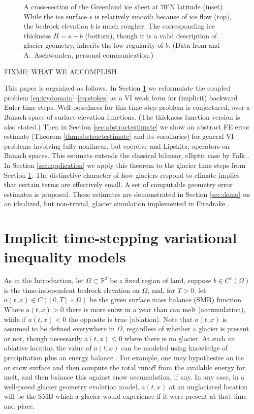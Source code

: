 \documentclass[hidelinks,onefignum,onetabnum,final]{siamart220329}  %
\newcommand{\RR}{\mathbb{R}}
\begin{document}
\begin{figure}
\begin{minipage}[t]{0.13\textwidth}
\end{minipage}
\caption{A cross-section of the Greenland ice sheet at $70^\circ$N latitude (inset).  While the ice surface $s$ is relatively smooth because of ice flow (top), the bedrock elevation $b$ is much rougher.  The corresponding ice thickness $H = s-b$ (bottom), though it is a valid description of glacier geometry, inherits the low regularity of $b$.  (Data from \cite{Morlighemetal2017} and A.~Aschwanden, personal communication.)}
\label{fig:giscross}
\end{figure}

FIXME: WHAT WE ACCOMPLISH

This paper is organized as follows.  In Section \ref{sec:models} we reformulate the coupled problem \eqref{eq:icydomain}--\eqref{eq:stokes} as a VI weak form for (implicit) backward Euler time steps.  Well-posedness for this time-step problem is conjectured, over a Banach space of surface elevation functions.  (The thickness function version is also stated.)  Then in Section \ref{sec:abstractestimate} we show an abstract FE error estimate (Theorem \ref{thm:abstractestimate} and its corollaries) for general VI problems involving fully-nonlinear, but coercive and Lipshitz, operators on Banach spaces.  This estimate extends the classical bilinear, elliptic case by Falk \cite{Falk1974}.  In Section \ref{sec:application} we apply this theorem to the glacier time steps from Section \ref{sec:models}.  The distinctive character of how glaciers respond to climate implies that certain terms are effectively small.  A set of computable geometry error estimates is proposed.  These estimates are demonstrated in Section \ref{sec:demo} on an idealized, but non-trivial, glacier simulation implemented in Firedrake \cite{Hametal2023}.


\section{Implicit time-stepping variational inequality models} \label{sec:models}

As in the Introduction, let $\Omega \subset \RR^2$ be a fixed region of land, suppose $b \in C^1(\Omega)$ is the time-independent bedrock elevation on $\Omega$, and, for $T>0$, let $a(t,x) \in C([0,T] \times \Omega)$ be the given surface mass balance (SMB) function.  Where $a(t,x)>0$ there is more snow in a year than can melt (accumulation), while if $a(t,x)<0$ the opposite is true (ablation).  Note that $a(t,x)$ is assumed to be defined everywhere in $\Omega$, regardless of whether a glacier is present or not, though necessarily $a(t,x) \le 0$ where there is no glacier.  At such an ablative location the value of $a(t,x)$ can be modeled using knowledge of precipitation plus an energy balance \cite{GreveBlatter2009}.  For example, one may hypothesize an ice or snow surface and then compute the total runoff from the available energy for melt, and then balance this against snow accumulation, if any.  In any case, in a well-posed glacier geometry evolution model, $a(t,x)$ at an unglaciated location will be the SMB which a glacier would experience if it were present at that time and place.
\end{document}
